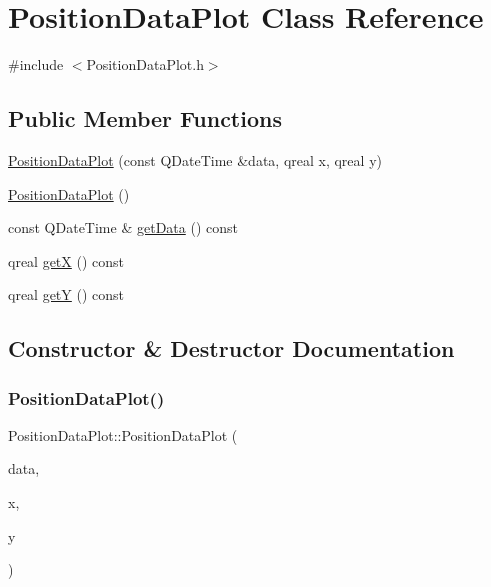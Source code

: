\hypertarget{class_position_data_plot}{}\section{Position\+Data\+Plot Class Reference}
\label{class_position_data_plot}


{\ttfamily \#include $<$Position\+Data\+Plot.\+h$>$}

\subsection*{Public Member Functions}
\begin{DoxyCompactItemize}
\item 
\hyperlink{class_position_data_plot_aee770d96d686d475e59bf3a0b42907a3}{Position\+Data\+Plot} (const Q\+Date\+Time \&data, qreal x, qreal y)
\item 
\hyperlink{class_position_data_plot_a56e85a65b66d362ef17b8399044df898}{Position\+Data\+Plot} ()
\item 
const Q\+Date\+Time \& \hyperlink{class_position_data_plot_acd1fdbf5c35f3399d27c803e908f773a}{get\+Data} () const
\item 
qreal \hyperlink{class_position_data_plot_ae2dba1fa84c16dd89895940fb04963da}{getX} () const
\item 
qreal \hyperlink{class_position_data_plot_ab678bdd19b9be8eadefa35f58a770704}{getY} () const
\end{DoxyCompactItemize}


\subsection{Constructor \& Destructor Documentation}
\mbox{\label{class_position_data_plot_aee770d96d686d475e59bf3a0b42907a3}} 
\subsubsection{\texorpdfstring{Position\+Data\+Plot()}{PositionDataPlot()}\hspace{0.1cm}{\footnotesize\ttfamily [1/2]}}
{\footnotesize\ttfamily Position\+Data\+Plot\+::\+Position\+Data\+Plot (\begin{DoxyParamCaption}\item[{const Q\+Date\+Time \&}]{data,  }\item[{qreal}]{x,  }\item[{qreal}]{y }\end{DoxyParamCaption})}

